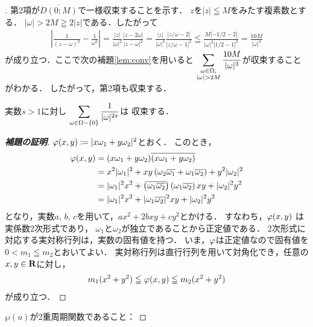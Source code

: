 \begin{proof}[\pfb]
    第2項が$\overline{D(0;M)}$で一様収束することを示す．
    $z$を$|z|\leqq M$をみたす複素数とする．
    $|\omega|>2M\geqq2|z|$である．したがって
    \begin{align*}
        \left|\frac{1}{(z-\omega)^2}-\frac{1}{\omega^2}\right|
        =\frac{|z|}{|\omega|^2}\frac{|z-2\omega|}{|z-\omega|^2}
        =\frac{|z|}{|\omega|^3}\frac{|z/\omega-2|}{|z/\omega-1|^2}
        \leqq\frac{M|-1/2-2|}{|\omega|^3|1/2-1|^2}
        =\frac{10M}{|\omega|^3}    
    \end{align*}
    が成り立つ．ここで次の補題\ref{lem:conv}を用いると
    $\dip \sum_{\substack{\omega\in\Omega,\\|\omega|>2M}}
    \frac{10M}{|\omega|^{3}}$が収束することがわかる．
    したがって，第2項も収束する．
    \begin{Lemma}\label{lem:conv}
        実数$s>1$に対し
        $\displaystyle \sum_{\omega\in\Omega-\{0\}}\frac{1}{|\omega|^{2s}}$は
        収束する．
    \end{Lemma}
    \begin{proof}[\textbf{補題の証明}]
        $\varphi(x,y)\coloneqq |x\omega_1+y\omega_2|^2$とおく．
        このとき，
        \begin{align*}
            \varphi(x,y)
            &=(x\omega_1+y\omega_2)\overline{(x\omega_1+y\omega_2)}\\
            &=x^2|\omega_1|^2+xy\left(
                \omega_2\overline{\omega_1}+\omega_1\overline{\omega_2}
                \right)+y^2|\omega_2|^2\\
            &=|\omega_1|^2x^2+\left(
                \overline{\omega_1\overline{\omega_2}}
                \right)\left(\omega_1\overline{\omega_2}
                \right)xy+|\omega_2|^2y^2\\
            &=|\omega_1|^2x^2+|\omega_1\overline{\omega_2}|^2xy+|\omega_2|^2y^2
        \end{align*}
        となり，実数$a$, $b$, $c$を用いて，$ax^2+2bxy+cy^2$とかける．
        すなわち，$\varphi(x,y)$ は実係数2次形式であり，
        $\omega_1$と$\omega_2$が独立であることから正定値である．
        2次形式に対応する実対称行列は，実数の固有値を持つ．
        いま，$\varphi$は正定値なので固有値を$0< m_1\leqq m_2$とおいてよい．
        実対称行列は直行行列を用いて対角化でき，任意の$x,y\in\mathbf{R}$に対し，
        \begin{align*}
            m_1(x^2+y^2)\leqq\varphi(x,y)\leqq m_2(x^2+y^2)
        \end{align*}
        が成り立つ．
    \end{proof}


    $\wp(u)$が2重周期関数であること：
\end{proof}
